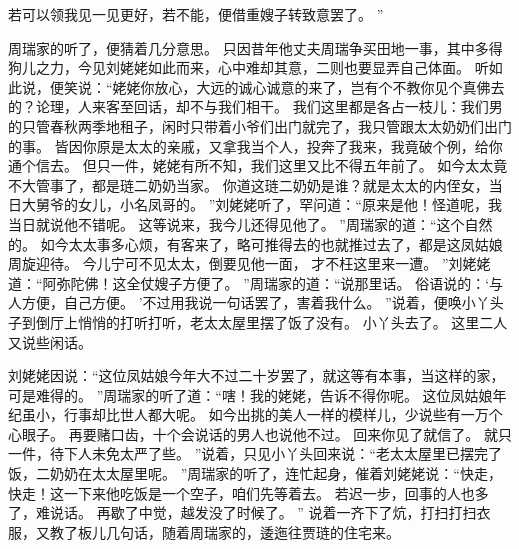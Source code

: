 若可以领我见一见更好，若不能，便借重嫂子转致意罢了。
”\par
周瑞家的听了，便猜着几分意思。
只因昔年他丈夫周瑞争买田地一事，其中多得狗儿之力，今见刘姥姥如此而来，心中难却其意，二则也要显弄自己体面。
听如此说，便笑说：“姥姥你放心，大远的诚心诚意的来了，岂有个不教你见个真佛去的？论理，人来客至回话，却不与我们相干。
我们这里都是各占一枝儿：我们男的只管春秋两季地租子，闲时只带着小爷们出门就完了，我只管跟太太奶奶们出门的事。
皆因你原是太太的亲戚，又拿我当个人，投奔了我来，我竟破个例，给你通个信去。
但只一件，姥姥有所不知，我们这里又比不得五年前了。
如今太太竟不大管事了，都是琏二奶奶当家。
你道这琏二奶奶是谁？就是太太的内侄女，当日大舅爷的女儿，小名凤哥的。
”刘姥姥听了，罕问道：“原来是他！怪道呢，我当日就说他不错呢。
这等说来，我今儿还得见他了。
”周瑞家的道：“这个自然的。
如今太太事多心烦，有客来了，略可推得去的也就推过去了，都是这凤姑娘周旋迎待。
今儿宁可不见太太，倒要见他一面，
才不枉这里来一遭。
”刘姥姥道：“阿弥陀佛！这全仗嫂子方便了。
”周瑞家的道：“说那里话。
俗语说的：‘与人方便，自己方便。
’不过用我说一句话罢了，害着我什么。
”说着，便唤小丫头子到倒厅上悄悄的打听打听，老太太屋里摆了饭了没有。
小丫头去了。
这里二人又说些闲话。
\par
刘姥姥因说：“这位凤姑娘今年大不过二十岁罢了，就这等有本事，当这样的家，可是难得的。
”周瑞家的听了道：“嗐！我的姥姥，告诉不得你呢。
这位凤姑娘年纪虽小，行事却比世人都大呢。
如今出挑的美人一样的模样儿，少说些有一万个心眼子。
再要赌口齿，十个会说话的男人也说他不过。
回来你见了就信了。
就只一件，待下人未免太严了些。
”说着，只见小丫头回来说：“老太太屋里已摆完了饭，二奶奶在太太屋里呢。
”周瑞家的听了，连忙起身，催着刘姥姥说：“快走，快走！这一下来他吃饭是一个空子，咱们先等着去。
若迟一步，回事的人也多了，难说话。
再歇了中觉，越发没了时候了。
”
说着一齐下了炕，打扫打扫衣服，又教了板儿几句话，随着周瑞家的，逶迤往贾琏的住宅来。
